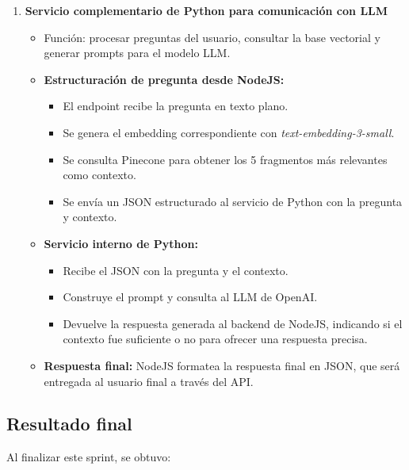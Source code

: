 \begin{enumerate}
      \item \textbf{Servicio complementario de Python para comunicación con LLM}
            \begin{itemize}
                  \item Función: procesar preguntas del usuario, consultar la base vectorial y generar
                        prompts para el modelo LLM.
                  \item \textbf{Estructuración de pregunta desde NodeJS:}
                        \begin{itemize}
                              \item El endpoint recibe la pregunta en texto plano.
                              \item Se genera el embedding correspondiente con \textit{text-embedding-3-small}.
                              \item Se consulta Pinecone para obtener los 5 fragmentos más relevantes como
                                    contexto.
                              \item Se envía un JSON estructurado al servicio de Python con la pregunta y contexto.
                        \end{itemize}
                  \item \textbf{Servicio interno de Python:}
                        \begin{itemize}
                              \item Recibe el JSON con la pregunta y el contexto.
                              \item Construye el prompt y consulta al LLM de OpenAI.
                              \item Devuelve la respuesta generada al backend de NodeJS, indicando si el contexto
                                    fue suficiente o no para ofrecer una respuesta precisa.
                        \end{itemize}
                  \item \textbf{Respuesta final:} NodeJS formatea la respuesta final en JSON, que será entregada al usuario final a través del API.
            \end{itemize}

\end{enumerate}

\subsection{Resultado final}
Al finalizar este sprint, se obtuvo:

